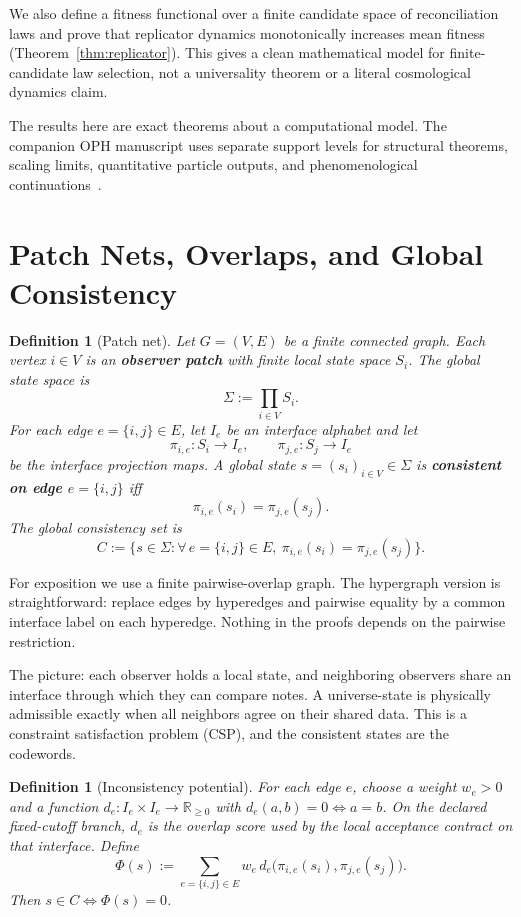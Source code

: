 \documentclass[11pt]{article}
\newtheorem{definition}[theorem]{Definition}
\theoremstyle{remark}
\theoremstyle{plain}
\begin{document}
We also define a fitness functional over a finite candidate space of reconciliation laws and prove
that replicator dynamics monotonically increases mean fitness (Theorem~\ref{thm:replicator}). This
gives a clean mathematical model for finite-candidate law selection, not a universality theorem or
a literal cosmological dynamics claim.

The results here are exact theorems about a computational model. The companion
OPH manuscript uses separate support levels for structural theorems, scaling
limits, quantitative particle outputs, and phenomenological
continuations~\cite{OPH}.


\section{Patch Nets, Overlaps, and Global Consistency}

\begin{definition}[Patch net]\label{def:patchnet}
Let $G=(V,E)$ be a finite connected graph. Each vertex $i\in V$ is an \textbf{observer patch} with finite local state space $S_i$. The global state space is
\[
\Sigma := \prod_{i\in V} S_i.
\]
For each edge $e=\{i,j\}\in E$, let $I_e$ be an interface alphabet and let
\[
\pi_{i,e}:S_i\to I_e,
\qquad
\pi_{j,e}:S_j\to I_e
\]
be the interface projection maps. A global state $s=(s_i)_{i\in V}\in\Sigma$ is \textbf{consistent on edge $e=\{i,j\}$} iff
\[
\pi_{i,e}(s_i)=\pi_{j,e}(s_j).
\]
The global consistency set is
\[
C:=\bigl\{s\in\Sigma:\forall\, e=\{i,j\}\in E,\ \pi_{i,e}(s_i)=\pi_{j,e}(s_j)\bigr\}.
\]
\end{definition}

For exposition we use a finite pairwise-overlap graph. The hypergraph version is straightforward: replace edges by hyperedges and pairwise equality by a common interface label on each hyperedge. Nothing in the proofs depends on the pairwise restriction.

The picture: each observer holds a local state, and neighboring observers share an interface through which they can compare notes. A universe-state is physically admissible exactly when all neighbors agree on their shared data. This is a constraint satisfaction problem (CSP), and the consistent states are the codewords.

\begin{definition}[Inconsistency potential]\label{def:potential}
For each edge $e$, choose a weight $w_e>0$ and a function $d_e:I_e\times I_e\to\mathbb{R}_{\ge 0}$ with $d_e(a,b)=0 \iff a=b$. On the declared fixed-cutoff branch, \(d_e\) is the overlap score used by the local acceptance contract on that interface. Define
\[
\Phi(s)
:=
\sum_{e=\{i,j\}\in E}
w_e\, d_e\!\bigl(\pi_{i,e}(s_i),\pi_{j,e}(s_j)\bigr).
\]
Then $s\in C \iff \Phi(s)=0$.
\end{definition}
\end{document}
